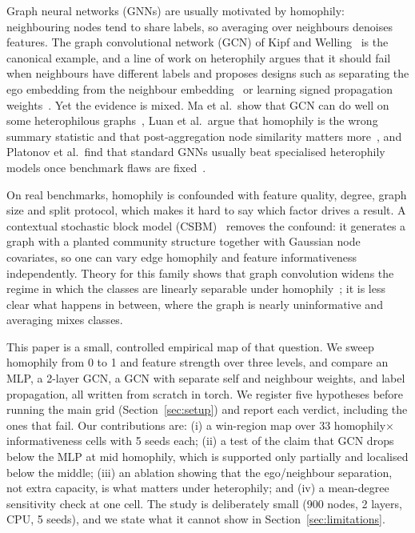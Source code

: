Graph neural networks (GNNs) are usually motivated by homophily: neighbouring nodes tend to share labels, so averaging over neighbours denoises features. The graph convolutional network (GCN) of Kipf and Welling~\cite{kipf2016semi} is the canonical example, and a line of work on heterophily argues that it should fail when neighbours have different labels and proposes designs such as separating the ego embedding from the neighbour embedding~\cite{zhu2020beyond} or learning signed propagation weights~\cite{chien2020adaptive}. Yet the evidence is mixed. Ma et al.\ show that GCN can do well on some heterophilous graphs~\cite{ma2021is}, Luan et al.\ argue that homophily is the wrong summary statistic and that post-aggregation node similarity matters more~\cite{luan2022revisiting}, and Platonov et al.\ find that standard GNNs usually beat specialised heterophily models once benchmark flaws are fixed~\cite{platonov2023critical}.

On real benchmarks, homophily is confounded with feature quality, degree, graph size and split protocol, which makes it hard to say which factor drives a result. A contextual stochastic block model (CSBM)~\cite{deshpande2018contextual} removes the confound: it generates a graph with a planted community structure together with Gaussian node covariates, so one can vary edge homophily and feature informativeness independently. Theory for this family shows that graph convolution widens the regime in which the classes are linearly separable under homophily~\cite{baranwal2021graph}; it is less clear what happens in between, where the graph is nearly uninformative and averaging mixes classes.

This paper is a small, controlled empirical map of that question. We sweep homophily from 0 to 1 and feature strength over three levels, and compare an MLP, a 2-layer GCN, a GCN with separate self and neighbour weights, and label propagation, all written from scratch in torch. We register five hypotheses before running the main grid (Section~\ref{sec:setup}) and report each verdict, including the ones that fail. Our contributions are: (i) a win-region map over 33 homophily$\times$informativeness cells with 5 seeds each; (ii) a test of the claim that GCN drops below the MLP at mid homophily, which is supported only partially and localised below the middle; (iii) an ablation showing that the ego/neighbour separation, not extra capacity, is what matters under heterophily; and (iv) a mean-degree sensitivity check at one cell. The study is deliberately small (900 nodes, 2 layers, CPU, 5 seeds), and we state what it cannot show in Section~\ref{sec:limitations}.
